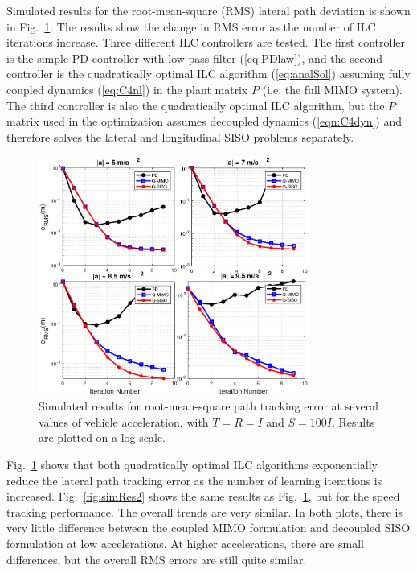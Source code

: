 \documentclass[9pt,shortpaper,twoside,web]{ieeecolor}
\begin{document}
Simulated results for the root-mean-square (RMS) lateral path deviation is shown in Fig.~\ref{fig:simRes1}. The results
show the change in RMS error as the number of ILC iterations increase. Three different ILC controllers are tested. 
The first controller is the simple PD controller
with low-pass filter (\ref{eq:PDlaw}), and the second controller is the quadratically optimal ILC algorithm (\ref{eq:analSol}) assuming fully coupled dynamics (\ref{eq:C4nl}) in the plant
matrix $P$ (i.e. the full MIMO system).
The third controller is also the quadratically optimal ILC algorithm, but the $P$ matrix used in the optimization
assumes decoupled dynamics (\ref{eqn:C4dyn}) and therefore solves the lateral and longitudinal SISO problems separately. 

\begin{figure}[h!]
\centering
\includegraphics[width=3.5in]{figures/simRes1.eps}
\caption[Simulated results for root-mean-square path tracking error at several values of vehicle acceleration]{Simulated results for root-mean-square path tracking error at several values of vehicle acceleration, with $T = R = I$ and $S = \mathrm{100} I$.
Results are plotted on a log scale.}
\label{fig:simRes1}
\end{figure}

Fig.~\ref{fig:simRes1} shows that both quadratically optimal ILC algorithms exponentially reduce the lateral
path tracking error as the number of learning iterations is increased. Fig.~\ref{fig:simRes2} shows the same results as Fig.~\ref{fig:simRes1}, but for the speed tracking performance. The overall trends are very similar. In both plots, there is very little difference between the coupled MIMO formulation and decoupled SISO formulation at low accelerations. At higher accelerations, there are small differences, but the overall RMS errors are still quite similar.
\end{document}
